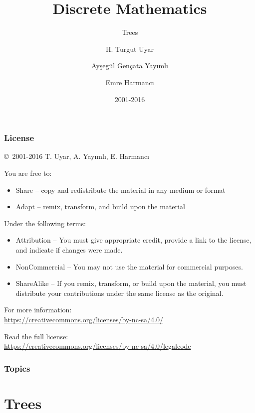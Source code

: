 \documentclass[dvipsnames]{beamer}
\title{Discrete Mathematics}
\subtitle{Trees}
\author{H. Turgut Uyar \and Ayşegül Gençata Yayımlı \and Emre Harmancı}
\date{2001-2016}
\begin{document}
\begin{frame}
  \titlepage
\end{frame}

\begin{frame}
  \frametitle{License}

  \hfill
  \copyright~2001-2016 T. Uyar, A. Yayımlı, E. Harmancı

  \vfill
  \begin{footnotesize}
    You are free to:
    \begin{itemize}
      \itemsep0em
      \item Share -- copy and redistribute the material in any medium or format
      \item Adapt -- remix, transform, and build upon the material
    \end{itemize}

    Under the following terms:
    \begin{itemize}
      \itemsep0em
      \item Attribution -- You must give appropriate credit, provide a link to
        the license, and indicate if changes were made.

      \item NonCommercial -- You may not use the material for commercial
        purposes.

      \item ShareAlike -- If you remix, transform, or build upon the material,
        you must distribute your contributions under the same license as the
        original.
    \end{itemize}
  \end{footnotesize}

  \begin{small}
    For more information:\\
    \url{https://creativecommons.org/licenses/by-nc-sa/4.0/}

    \smallskip
    Read the full license:\\
    \url{https://creativecommons.org/licenses/by-nc-sa/4.0/legalcode}
  \end{small}
\end{frame}

\begin{frame}
  \frametitle{Topics}
  \tableofcontents
\end{frame}

\section{Trees}
\end{document}
